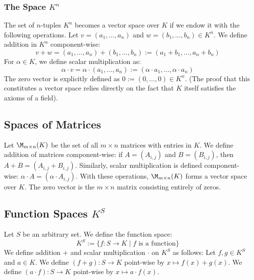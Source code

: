 \subsubsection{The Space $K^n$}
\begin{example}
The set of $n$-tuples $K^n$ becomes a vector space over $K$ if we endow it with the following operations. 
Let $v = (a_1, \dots, a_n)$ and $w = (b_1, \dots, b_n) \in K^n$. We define addition in $K^n$ component-wise:
\[
v + w = (a_1, \dots, a_n) + (b_1, \dots, b_n) := (a_1 + b_1, \dots, a_n + b_n)
\]
For $\alpha \in K$, we define scalar multiplication as:
\[
\alpha \cdot v = \alpha \cdot (a_1, \dots, a_n) := (\alpha \cdot a_1, \dots, \alpha \cdot a_n)
\]
The zero vector is explicitly defined as $0 := (0, \dots, 0) \in K^n$. 
(The proof that this constitutes a vector space relies directly on the fact that $K$ itself satisfies the axioms of a field).
\end{example}

\subsection{Spaces of Matrices}
\begin{example}
Let $\M_{m \times n}(K)$ be the set of all $m \times n$ matrices with entries in $K$. We define addition of matrices component-wise: if $A = (A_{i,j})$ and $B = (B_{i,j})$, then $A + B = (A_{i,j} + B_{i,j})$. Similarly, scalar multiplication is defined component-wise: $\alpha \cdot A = (\alpha \cdot A_{i,j})$. With these operations, $\M_{m \times n}(K)$ forms a vector space over $K$. The zero vector is the $m \times n$ matrix consisting entirely of zeros.
\end{example}

\subsection{Function Spaces \texorpdfstring{$K^S$}{S to K}}
\begin{example}
Let $S$ be an arbitrary set. We define the function space:
\[
K^S := \{f: S \to K \mid f \text{ is a function}\}
\]
We define addition $+$ and scalar multiplication $\cdot$ on $K^S$ as follows: 
Let $f, g \in K^S$ and $a \in K$. 
We define $(f + g): S \to K$ point-wise by $x \mapsto f(x) + g(x)$.
We define $(a \cdot f): S \to K$ point-wise by $x \mapsto a \cdot f(x)$.
\end{example}


